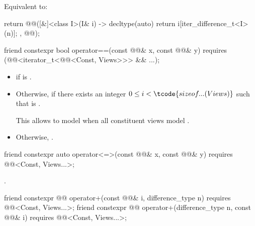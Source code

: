 \begin{itemdescr}
\pnum
\effects
Equivalent to:
\begin{codeblock}
return @@([&]<class I>(I& i) -> decltype(auto) {
  return i[iter_difference_t<I>(n)];
}, @@);
\end{codeblock}
\end{itemdescr}

%
\begin{itemdecl}
friend constexpr bool operator==(const @@& x, const @@& y)
  requires (@@<iterator_t<@@<Const, Views>>> && ...);
\end{itemdecl}

\begin{itemdescr}
\pnum
\returns
\begin{itemize}
\item
{}
if  is .
\item
Otherwise, 
if there exists an integer $0 \leq i < \tcode{sizeof...(Views)}$
such that  is .
\begin{note}
This allows  to model 
when all constituent views model .
\end{note}
\item
Otherwise, .
\end{itemize}
\end{itemdescr}

%
\begin{itemdecl}
friend constexpr auto operator<=>(const @@& x, const @@& y)
  requires @@<Const, Views...>;
\end{itemdecl}

\begin{itemdescr}
\pnum
\returns
{}.
\end{itemdescr}

%
\begin{itemdecl}
friend constexpr @@ operator+(const @@& i, difference_type n)
  requires @@<Const, Views...>;
friend constexpr @@ operator+(difference_type n, const @@& i)
  requires @@<Const, Views...>;
\end{itemdecl}

